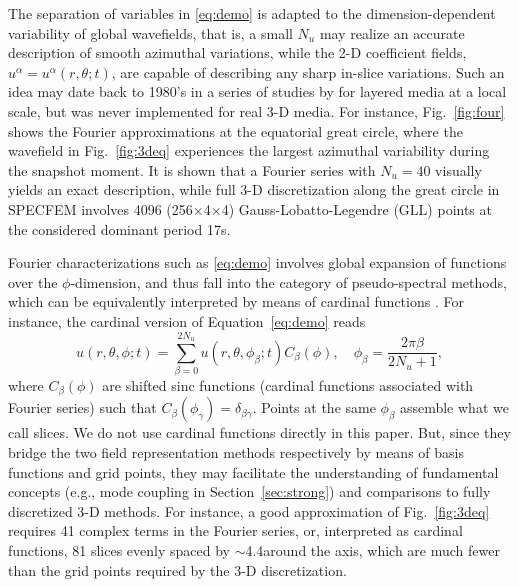 \documentclass[extra,referee]{gji}
\begin{document}
The separation of variables in \eqref{eq:demo} is 
adapted to the dimension-dependent variability of global wavefields, that is, 
a small $N_u$ may realize an accurate description of smooth azimuthal variations, 
while the 2-D coefficient fields, $u^\alpha=u^\alpha\left(r,\theta;t\right)$, 
are capable of describing any sharp in-slice variations. 
Such an idea may date back to 1980's in a series of studies by 
\cite{alekseev1980solution, mikhailenko1984synthetic,
mikhailenko1984calculation} for layered media at a local scale, but
was never implemented for real 3-D media. 
For instance, Fig.~\ref{fig:four} shows the Fourier approximations at
the equatorial great circle, where the wavefield in Fig.~\ref{fig:3deq} 
experiences the largest azimuthal variability during the snapshot moment. 
It is shown that a Fourier series with $N_u=40$ visually yields
an exact description, while full 3-D discretization along the great circle
in SPECFEM involves 4096 (256$\times$4$\times$4) Gauss-Lobatto-Legendre (GLL) 
points at the considered dominant period 17s. 

Fourier characterizations such as \eqref{eq:demo} involves global expansion of 
functions over the $\phi$-dimension, and thus fall into the category of 
pseudo-spectral methods, which can be equivalently interpreted by means of 
cardinal functions \cite[Chap 5,][]{boyd2001spectral}.
For instance, the cardinal version of Equation~\eqref{eq:demo} reads
\begin{equation}
  u\left(r,\theta,\phi;t\right)=\sum_{\beta=0}^{2N_u} 
  u\left(r,\theta,\phi_\beta;t\right)C_\beta\left(\phi\right),\quad 
  \phi_\beta=\frac{2\pi \beta}{2N_u+1},
  \label{eq:card}
\end{equation}
where $C_\beta\left(\phi\right)$ are shifted sinc functions (cardinal functions
associated with Fourier series) such that 
$C_\beta\left(\phi_\gamma\right)=\delta_{\beta\gamma}$.   
Points at the same $\phi_\beta$ assemble what we call slices. 
We do not use cardinal functions directly in this paper. 
But, since they bridge the two field representation methods respectively  
by means of basis functions and grid points, 
they may facilitate the understanding of fundamental concepts 
(e.g., mode coupling in Section~\ref{sec:strong}) and comparisons
to fully discretized 3-D methods. For instance, a good approximation
of Fig.~\ref{fig:3deq} requires 41 complex terms in the 
Fourier series, or, interpreted as cardinal functions, 
81 slices evenly spaced by $\sim$4.4\degr around the axis, 
which are much fewer than the grid points required by the 
3-D discretization.     
\end{document}

